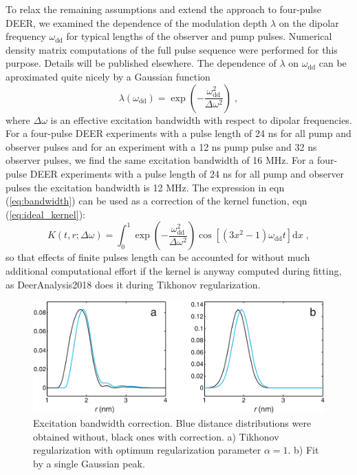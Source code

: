 \documentclass{article}
\begin{document}
To relax the remaining assumptions and extend the approach to four-pulse DEER, we examined the dependence of the modulation depth $\lambda$ on the dipolar frequency $\omega_{\mathrm{dd}}$ for typical lengths of the observer and pump pulses. Numerical density matrix computations of the full pulse sequence were performed for this purpose. Details will be published elsewhere. The dependence of $\lambda$ on $\omega_{\mathrm{dd}}$ can be aproximated quite nicely by a Gaussian function
\begin{equation}
	\lambda \left( \omega_{\mathrm{dd}} \right) = \exp \left( - \frac{\omega_{\mathrm{dd}}^2}{\Delta \omega ^2} \right) \; ,
	\label{eq:bandwidth}
\end{equation}
where $\Delta \omega$ is an effective excitation bandwidth with respect to dipolar frequencies. For a four-pulse DEER experiments with a pulse length of 24 ns for all pump and observer pulses and for an experiment with a 12 ns pump pulse and 32 ns observer pulses, we find the same excitation bandwidth of 16 MHz. For a four-pulse DEER experiments with a pulse length of 24 ns for all pump and observer pulses the excitation bandwidth is 12 MHz. The expression in eqn (\ref{eq:bandwidth}) can be used as a correction of the kernel function, eqn (\ref{eq:ideal_kernel}):
\begin{equation}
	K \left( t, r; \Delta \omega \right) = \int _0 ^1 \exp \left( - \frac{\omega_{\mathrm{dd}}^2}{\Delta \omega ^2} \right) \cos \left[ \left( 3x^2-1 \right) \omega_{\mathrm{dd}} t \right] \mathrm{d}x \; ,
	\label{eq:real_kernel}
\end{equation}
so that effects of finite pulses length can be accounted for without much additional computational effort if the kernel is anyway computed during fitting, as DeerAnalysis2018 does it during Tikhonov regularization. 

\begin{figure}[ht]
 	\begin{center}
  \includegraphics[width=1.0\textwidth]{fig7.pdf}
	\end{center}
	\caption{Excitation bandwidth correction. Blue distance distributions were obtained without, black ones with correction. a) Tikhonov regularization with optimum regularization parameter $\alpha=1$. b) Fit by a single Gaussian peak.}
	\label{fig:manfig7}
\end{figure}
\end{document}
